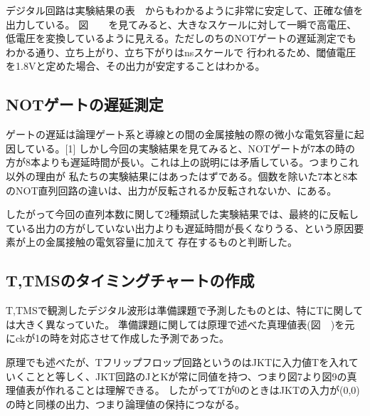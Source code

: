 \documentclass[11pt,a4j]{jsarticle}
\begin{document}
  デジタル回路は実験結果の表\ \ からもわかるように非常に安定して、正確な値を出力している。
  図\ \ \ \ を見てみると、大きなスケールに対して一瞬で高電圧、低電圧を変換しているように見える。ただしのちのNOTゲートの遅延測定でもわかる通り、立ち上がり、立ち下がりはnsスケールで
  行われるため、閾値電圧を1.8Vと定めた場合、その出力が安定することはわかる。
  
  \subsection{NOTゲートの遅延測定}
  ゲートの遅延は論理ゲート系と導線との間の金属接触の際の微小な電気容量に起因している。[1]
  しかし今回の実験結果を見てみると、NOTゲートが7本の時の方が8本よりも遅延時間が長い。これは上の説明には矛盾している。つまりこれ以外の理由が
  私たちの実験結果にはあったはずである。個数を除いた7本と8本のNOT直列回路の違いは、出力が反転されるか反転されないか、にある。
  
  したがって今回の直列本数に関して2種類試した実験結果では、最終的に反転している出力の方がしていない出力よりも遅延時間が長くなりうる、という原因要素が上の金属接触の電気容量に加えて
  存在するものと判断した。
  
  \newpage
  
  
  
  
  
  
  
  \subsection{T,TMSのタイミングチャートの作成}
  T,TMSで観測したデジタル波形は準備課題で予測したものとは、特にTに関しては大きく異なっていた。
  準備課題に関しては原理で述べた真理値表(図\ \ )を元にckが1の時を対応させて作成した予測であった。
  
  原理でも述べたが、Tフリップフロップ回路というのはJKTに入力値Tを入れていくことと等しく、JKT回路のJとKが常に同値を持つ、つまり図7より図9の真理値表が作れることは理解できる。
  したがってTが0のときはJKTの入力が(0,0)の時と同様の出力、つまり論理値の保持につながる。
  
\end{document}
